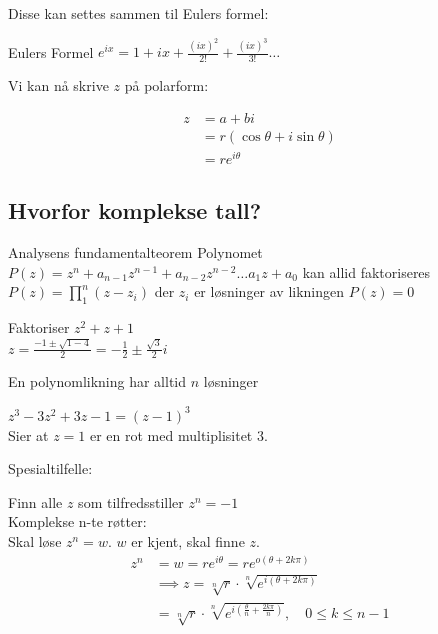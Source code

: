\documentclass[11pt, a4paper, norsk]{article}
\begin{document}
        Disse kan settes sammen til Eulers formel:
        \begin{Definition}{Eulers Formel}{}
            $e^{ix} = 1 + ix + \frac{(ix)^{2}}{2!} + \frac{(ix)^{3}}{3!} \dots$
        \end{Definition}

        Vi kan nå skrive $z$ på polarform:

        \begin{align*}
            z &= a + bi \\
              &= r(\cos{\theta} + i\sin{\theta}) \\
              &= re^{i\theta}
        \end{align*}
        
        \subsection{Hvorfor komplekse tall?}%
        \label{sub:hvorfor_komplekse_tall_}
        
        \begin{Theorem}{Analysens fundamentalteorem}{}
        Polynomet $P(z) = z^{n} + a_{n-1}z^{n-1} + a_{n-2}z^{n-2} \dots a_1z+a_0$ kan allid faktoriseres $P(z) = \prod_{1}^{n} (z-z_{i})$ der $z_{i}$ er løsninger av likningen $P(z) = 0$
        \end{Theorem}

        \begin{Example}{}{}
            Faktoriser $z^2 + z + 1$ \\
            $z = \frac{-1 \pm \sqrt{1-4}}{2} = -\frac{1}{2} \pm \frac{\sqrt{3}}{2}i$
        \end{Example}
        En polynomlikning har alltid $n$ løsninger
        \begin{Example}{}{}
            $z^{3} -3z^2 + 3z -1 = (z-1)^{3}$ \\
            Sier at $z = 1$ er en rot med multiplisitet 3.
        \end{Example}

        Spesialtilfelle: 

        \begin{Example}{}{}
            Finn alle $z$ som tilfredsstiller $z^{n} = -1$ \\
            Komplekse n-te røtter: \\
            Skal løse $z^{n} = w$. $w$ er kjent, skal finne $z$. \\
            \begin{align*}
                z^{n} &= w = re^{i\theta} = re^{o(\theta + 2k\pi)} \\
                      &\implies z = \sqrt[n]{r} \cdot \sqrt[n]{e^{i(\theta + 2k\pi)}} \\
                      &= \sqrt[n]{r} \cdot \sqrt[n]{e^{i(\frac{\theta}{n} + \frac{2k\pi}{n})}}, \quad 0 \leq k \leq n-1
            \end{align*}
        \end{Example}
        \newpage
\end{document}
